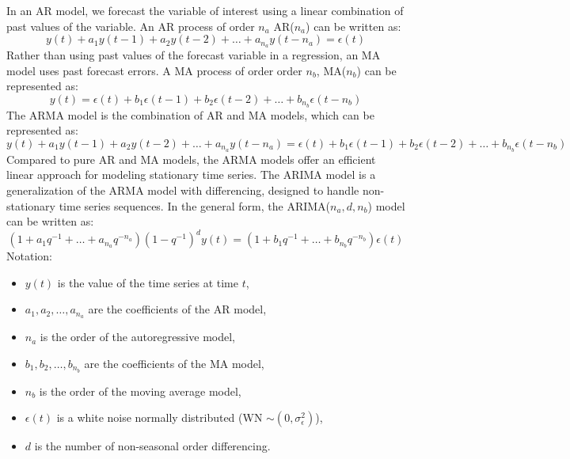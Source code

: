 \documentclass[sn-mathphys-num]{sn-jnl}
\theoremstyle{thmstyleone}%
\theoremstyle{thmstyletwo}%
\theoremstyle{thmstylethree}%
\begin{document}
In an AR model, we forecast the variable of interest using a linear combination of past values of the variable.
An AR process of order \( n_a \) AR(\( n_a \))  can be written as:
\[
y(t) + a_1 y(t-1) + a_2 y(t-2) + \dots + a_{n_a} y(t-{n_a}) = \epsilon(t)
\]
Rather than using past values of the forecast variable in a
regression, an MA model uses past forecast errors. A MA process of order order \( n_b \), MA(\( n_b \)) can be represented as:
\[
y(t) = \epsilon(t) + b_1 \epsilon(t-1) + b_2 \epsilon(t-2) + \dots + b_{n_b} \epsilon(t - n_b)
\]
The ARMA model is the combination of AR and MA models, which can be represented as:
\[
y(t) + a_1 y(t-1) + a_2 y(t-2) + \dots + a_{n_a} y(t-{n_a}) = \epsilon(t) + b_1 \epsilon(t-1) + b_2 \epsilon(t-2) + \dots + b_{n_b} \epsilon(t - n_b)
\]
Compared to pure AR and MA models, the ARMA models offer an efficient linear approach for modeling stationary time series. 
The ARIMA model is a generalization of the ARMA model with differencing, designed to handle non-stationary time series sequences. In the general form, the ARIMA(\(n_a, d, n_b\)) model can be written as:
$$
\left(1+a_1 q^{-1}+\dots+a_{n_a} q^{-n_a}\right)\left(1-q^{-1}\right)^d y(t) = \left(1+b_1 q^{-1}+\dots+b_{n_b} q^{-n_b}\right)\epsilon(t)$$
Notation:
\begin{itemize}
    \item \( y(t) \) is the value of the time series at time \( t \),
    \item \( a_1, a_2, \dots, a_{n_a} \) are the coefficients of the AR model,
    \item \( n_a \) is the order of the autoregressive model,
    \item \( b_1, b_2, \dots, b_{n_b} \) are the coefficients of the MA model,
    \item \( n_b \) is the order of the moving average model,
    \item \( \epsilon(t) \) is a white noise normally distributed (WN $\sim (0, \sigma_\epsilon^2)$),
    \item \( d \) is the number of non-seasonal order differencing.
\end{itemize}
\end{document}
